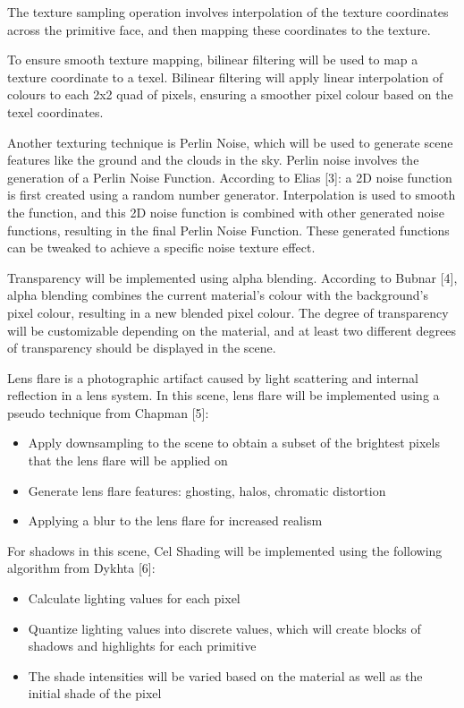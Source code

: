 \documentclass {article}
\begin{document}
\begin{description}
    The texture sampling operation involves interpolation of the texture coordinates across the primitive face, and then mapping these coordinates to the texture.

    To ensure smooth texture mapping, bilinear filtering will be used to map a texture coordinate to a texel. Bilinear filtering will apply linear interpolation of colours to each 2x2 quad of pixels, ensuring a smoother pixel colour based on the texel coordinates.

    Another texturing technique is Perlin Noise, which will be used to generate scene features like the ground and the clouds in the sky. Perlin noise involves the generation of a Perlin Noise Function. According to Elias [3]: a 2D noise function is first created using a random number generator. Interpolation is used to smooth the function, and this 2D noise function is combined with other generated noise functions, resulting in the final Perlin Noise Function. These generated functions can be tweaked to achieve a specific noise texture effect.

    Transparency will be implemented using alpha blending. According to Bubnar [4], alpha blending combines the current material’s colour with the background’s pixel colour, resulting in a new blended pixel colour. The degree of transparency will be customizable depending on the material, and at least two different degrees of transparency should be displayed in the scene.

    Lens flare is a photographic artifact caused by light scattering and internal reflection in a lens system. In this scene, lens flare will be implemented using a pseudo technique from Chapman [5]:

\begin{itemize}
    \item Apply downsampling to the scene to obtain a subset of the brightest pixels that the lens flare will be applied on
    \item Generate lens flare features: ghosting, halos, chromatic distortion
    \item Applying a blur to the lens flare for increased realism
\end{itemize}

    For shadows in this scene, Cel Shading will be implemented using the following algorithm from Dykhta [6]:

\begin{itemize}
    \item Calculate lighting values for each pixel
    \item Quantize lighting values into discrete values, which will create blocks of shadows and highlights for each primitive
    \item The shade intensities will be varied based on the material as well as the initial shade of the pixel
\end{itemize}


\end{description}
\end{document}
